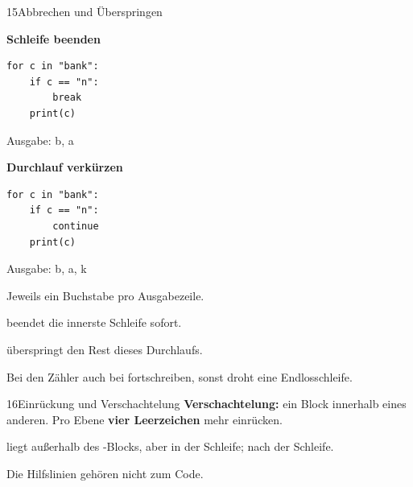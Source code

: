 \documentclass[9pt,a4paper]{extarticle}
\begin{document}
\begin{minipage}[t][255mm][s]{.489\textwidth}
\begin{karte}{15\enspace Abbrechen und Überspringen}
\begin{minipage}[t]{.48\linewidth}\vspace{0pt}
\textbf{Schleife beenden}
\begin{lstlisting}
for c in "bank":
    if c == "n":
        break
    print(c)
\end{lstlisting}
Ausgabe: b, a
\end{minipage}\hfill
\begin{minipage}[t]{.48\linewidth}\vspace{0pt}
\textbf{Durchlauf verkürzen}
\begin{lstlisting}
for c in "bank":
    if c == "n":
        continue
    print(c)
\end{lstlisting}
Ausgabe: b, a, k
\end{minipage}\par\smallskip
Jeweils ein Buchstabe pro Ausgabezeile.\par
\textbf{} beendet die innerste Schleife sofort.\par
\textbf{} überspringt den Rest dieses Durchlaufs.\par
Bei  den Zähler auch bei  fortschreiben, sonst droht eine Endlosschleife.
\end{karte}
\vfill
\begin{karte}{16\enspace Einrückung und Verschachtelung}
\textbf{Verschachtelung:} ein Block innerhalb eines anderen. Pro Ebene \textbf{vier Leerzeichen} mehr einrücken.\par\smallskip
{}\par\smallskip
{} liegt außerhalb des -Blocks, aber in der Schleife;  nach der Schleife.\par Die Hilfslinien gehören nicht zum Code.
\end{karte}

\end{minipage}
\end{document}

